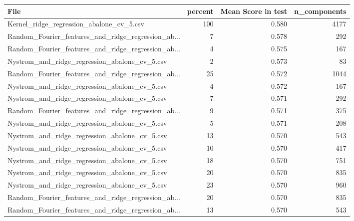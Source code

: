 \begin{tabularx}{\textwidth}{lrrr}
\toprule
                                              File &  percent &  Mean Score in test &  n\_components \\
\midrule
          Kernel\_ridge\_regression\_abalone\_cv\_5.csv &      100 &               0.580 &          4177 \\
Random\_Fourier\_features\_and\_ridge\_regression\_ab... &        7 &               0.578 &           292 \\
Random\_Fourier\_features\_and\_ridge\_regression\_ab... &        4 &               0.575 &           167 \\
     Nystrom\_and\_ridge\_regression\_abalone\_cv\_5.csv &        2 &               0.573 &            83 \\
Random\_Fourier\_features\_and\_ridge\_regression\_ab... &       25 &               0.572 &          1044 \\
     Nystrom\_and\_ridge\_regression\_abalone\_cv\_5.csv &        4 &               0.572 &           167 \\
     Nystrom\_and\_ridge\_regression\_abalone\_cv\_5.csv &        7 &               0.571 &           292 \\
Random\_Fourier\_features\_and\_ridge\_regression\_ab... &        9 &               0.571 &           375 \\
     Nystrom\_and\_ridge\_regression\_abalone\_cv\_5.csv &        5 &               0.571 &           208 \\
     Nystrom\_and\_ridge\_regression\_abalone\_cv\_5.csv &       13 &               0.570 &           543 \\
     Nystrom\_and\_ridge\_regression\_abalone\_cv\_5.csv &       10 &               0.570 &           417 \\
     Nystrom\_and\_ridge\_regression\_abalone\_cv\_5.csv &       18 &               0.570 &           751 \\
     Nystrom\_and\_ridge\_regression\_abalone\_cv\_5.csv &       20 &               0.570 &           835 \\
     Nystrom\_and\_ridge\_regression\_abalone\_cv\_5.csv &       23 &               0.570 &           960 \\
Random\_Fourier\_features\_and\_ridge\_regression\_ab... &       20 &               0.570 &           835 \\
Random\_Fourier\_features\_and\_ridge\_regression\_ab... &       13 &               0.570 &           543 \\

\end{tabularx}
